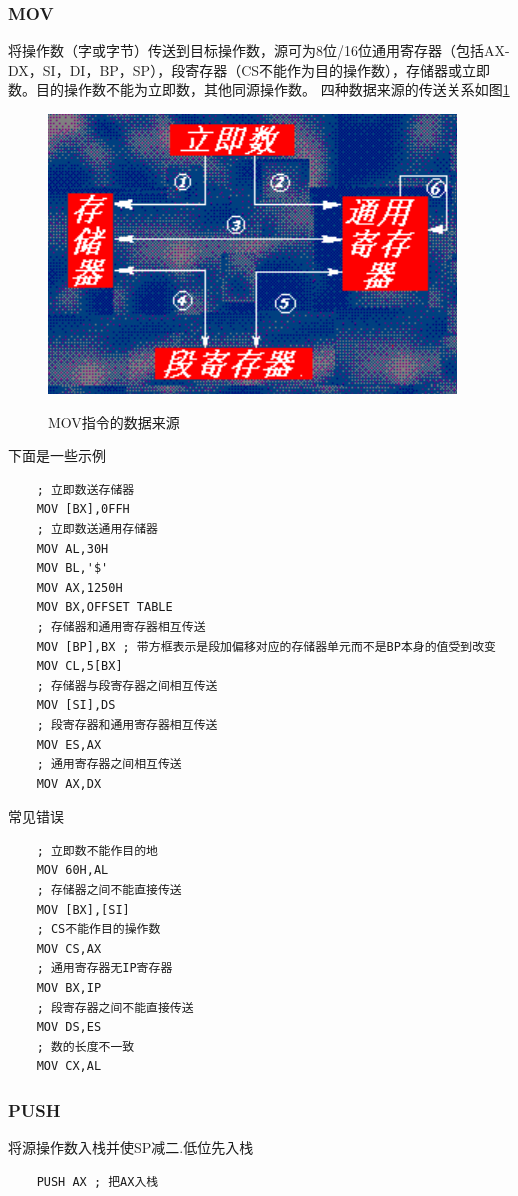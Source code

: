 \subsubsection{MOV}
将操作数（字或字节）传送到目标操作数，源可为8位/16位通用寄存器（包括AX-DX，SI，DI，BP，SP），段寄存器（CS不能作为目的操作数），存储器或立即数。目的操作数不能为立即数，其他同源操作数。
四种数据来源的传送关系如图\ref{MOV指令的数据来源}
\begin{figure}[H]
    \centering 
    \includegraphics[scale=1]{part_指令系统/part_指令系统_pic/MOV指令的数据来源.png}
    \label{MOV指令的数据来源}
    \caption{MOV指令的数据来源}
\end{figure}
下面是一些示例
\begin{lstlisting}
    ; 立即数送存储器
    MOV [BX],0FFH
    ; 立即数送通用存储器
    MOV AL,30H
    MOV BL,'$'
    MOV AX,1250H
    MOV BX,OFFSET TABLE
    ; 存储器和通用寄存器相互传送
    MOV [BP],BX ; 带方框表示是段加偏移对应的存储器单元而不是BP本身的值受到改变
    MOV CL,5[BX]
    ; 存储器与段寄存器之间相互传送
    MOV [SI],DS
    ; 段寄存器和通用寄存器相互传送
    MOV ES,AX
    ; 通用寄存器之间相互传送
    MOV AX,DX
\end{lstlisting}
常见错误
\begin{lstlisting}
    ; 立即数不能作目的地
    MOV 60H,AL
    ; 存储器之间不能直接传送
    MOV [BX],[SI]
    ; CS不能作目的操作数
    MOV CS,AX
    ; 通用寄存器无IP寄存器
    MOV BX,IP
    ; 段寄存器之间不能直接传送
    MOV DS,ES 
    ; 数的长度不一致
    MOV CX,AL
\end{lstlisting}
\subsubsection{PUSH}
将源操作数入栈并使SP减二.{\color{red}低位先入栈}
\begin{lstlisting}
    PUSH AX ; 把AX入栈
\end{lstlisting}
